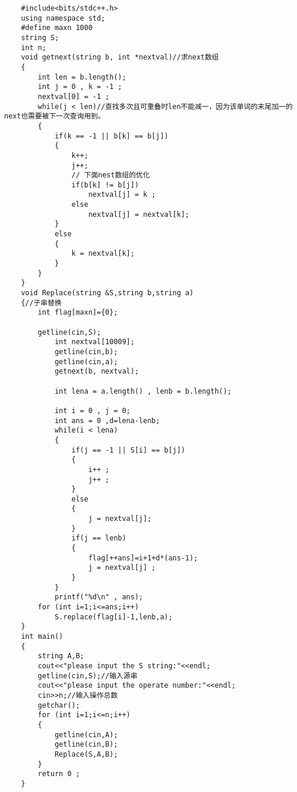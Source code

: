 \documentclass[UTF8,a4paper]{article}
\begin{document}
\begin{lstlisting}
    #include<bits/stdc++.h>
    using namespace std;
    #define maxn 1000
    string S;
    int n;
    void getnext(string b, int *nextval)//求next数组
    {
        int len = b.length();
        int j = 0 , k = -1 ;
        nextval[0] = -1 ;
        while(j < len)//查找多次且可重叠时len不能减一，因为该单词的末尾加一的next也需要被下一次查询用到。
        {
            if(k == -1 || b[k] == b[j])
            {
                k++;
                j++;
                // 下面nest数组的优化
                if(b[k] != b[j])
                    nextval[j] = k ;
                else
                    nextval[j] = nextval[k];
            }
            else
            {
                k = nextval[k];
            }
        }
    }
    void Replace(string &S,string b,string a)
    {//子串替换
        int flag[maxn]={0};
        
        getline(cin,S);
            int nextval[10009];
            getline(cin,b);
            getline(cin,a);
            getnext(b, nextval);
    
            int lena = a.length() , lenb = b.length();
            
            int i = 0 , j = 0;
            int ans = 0 ,d=lena-lenb;
            while(i < lena)
            {
                if(j == -1 || S[i] == b[j])
                {
                    i++ ;
                    j++ ;
                }
                else
                {
                    j = nextval[j];
                }
                if(j == lenb)
                {
                    flag[++ans]=i+1+d*(ans-1);
                    j = nextval[j] ;
                }
            }
            printf("%d\n" , ans);
        for (int i=1;i<=ans;i++)
            S.replace(flag[i]-1,lenb,a);
    }
    int main()
    {
        string A,B;
        cout<<"please input the S string:"<<endl;
        getline(cin,S);//输入源串
        cout<<"please input the operate number:"<<endl;
        cin>>n;//输入操作总数
        getchar();
        for (int i=1;i<=n;i++)
        {
            getline(cin,A);
            getline(cin,B);
            Replace(S,A,B);
        }
        return 0 ;
    }
\end{lstlisting}
\end{document}
